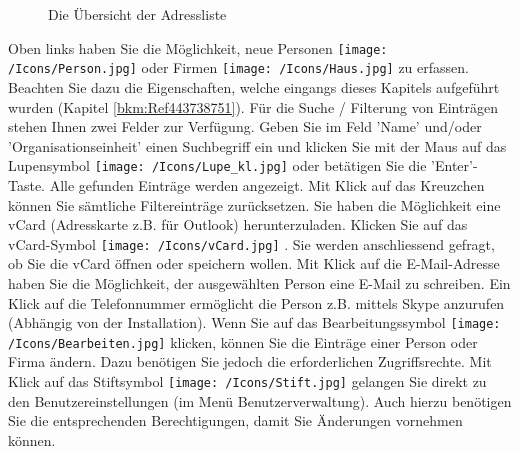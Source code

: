 \begin{figure}[H]
\caption{Die Übersicht der Adressliste}
\end{figure}

Oben links haben Sie die Möglichkeit, neue Personen \texttt{[image: /Icons/Person.jpg]} oder Firmen \texttt{[image: /Icons/Haus.jpg]} zu erfassen. Beachten Sie dazu die Eigenschaften, welche eingangs dieses Kapitels aufgeführt wurden (Kapitel \ref{bkm:Ref443738751}). \newline
Für die Suche / Filterung von Einträgen stehen Ihnen zwei Felder zur Verfügung. Geben Sie im Feld 'Name' und/oder 'Organisationseinheit'  einen Suchbegriff ein und klicken Sie mit der Maus auf das Lupensymbol \texttt{[image: /Icons/Lupe\_kl.jpg]}  oder betätigen Sie die 'Enter'-Taste. Alle gefunden Einträge werden angezeigt. Mit Klick auf das Kreuzchen  können Sie sämtliche Filtereinträge zurücksetzen. \newline
Sie haben die Möglichkeit eine vCard (Adresskarte z.B. für Outlook) herunterzuladen. Klicken Sie auf das vCard-Symbol \texttt{[image: /Icons/vCard.jpg]} . Sie werden anschliessend gefragt, ob Sie die vCard öffnen
oder speichern wollen.\newline
Mit Klick auf die E-Mail-Adresse  haben Sie die Möglichkeit, der ausgewählten Person eine E-Mail zu schreiben. Ein Klick auf die Telefonnummer  ermöglicht die Person z.B. mittels Skype anzurufen (Abhängig von der Installation).\newline
Wenn Sie auf das Bearbeitungssymbol \texttt{[image: /Icons/Bearbeiten.jpg]}  klicken, können Sie die Einträge einer Person oder Firma ändern. Dazu benötigen Sie jedoch die erforderlichen Zugriffsrechte. Mit Klick auf das Stiftsymbol \texttt{[image: /Icons/Stift.jpg]}  gelangen Sie direkt zu den Benutzereinstellungen (im Menü Benutzerverwaltung). Auch hierzu benötigen Sie die entsprechenden Berechtigungen, damit Sie Änderungen vornehmen können.

